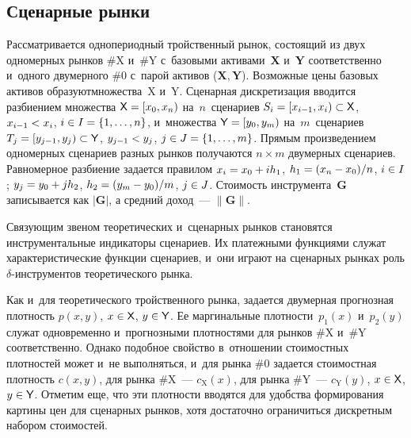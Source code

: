 \begin{multicols}{2}
\vspace*{-9pt} 
  
  \section{Сценарные рынки}
  
  \vspace*{-2pt}
  
  Рассматривается однопериодный тройственный рынок, состоящий из двух 
одномерных рынков \#X и~\#Y с~базовыми активами~$\boldsymbol{X}$ 
и~$\boldsymbol{Y}$ соответственно и~одного двумерного \#0 с~парой активов 
($\boldsymbol{X}, \boldsymbol{Y}$). Возможные цены базовых активов 
образуют\linebreak множества~{\sf X} и~{\sf Y}. Сценарная дискретизация\linebreak
 вводится 
разбиением множества ${\sf X} \hm=  [x_0, x_n)$ на~$n$~сценариев 
$S_i \hm= [x_{i-1}, x_i) \hm\subset {\sf X}$, $x_{i-1}\hm< x_i$, 
$i \hm\in I \hm= \{1, \ldots , n\}$, и~множества ${\sf Y}\hm = [y_0, y_m)$ 
на~$m$~сценариев $T_j\hm = [y_{j-1}, y_j) \hm\subset {\sf  Y}$, $y_{j-1}\hm<  y_j$, 
$j \hm\in J \hm= \{1, \ldots , m\}$. Прямым произведением одномерных 
сценариев разных рынков получаются $n\times m$ двумерных сценариев. 
Равномерное разбиение задается правилом $x_i \hm= x_0 \hm+ ih_1$, 
$h_1 \hm= (x_n \hm- x_0)/n$, $i \hm\in I$; $y_j\hm = y_0 + jh_2$, $h_2 \hm= (y_m \hm-
 y_0)/m$, $j\hm\in J$. Стоимость инструмента~$\boldsymbol{G}$ записывается 
как $\vert \boldsymbol{G}\vert$, а средний доход~--- $\| \boldsymbol{G}\|$.
  
  Связующим звеном теоретических и~сценарных рынков становятся 
инструментальные индикаторы сценариев. Их платежными функциями служат 
характеристические функции сценариев, и~они играют на сценарных рынках 
роль $\delta$-ин\-стру\-мен\-тов теоретического рынка. 
  
  Как и~для теоретического тройственного рынка, задается двумерная 
прогнозная плотность $p(x, y)$, $x\hm\in {\sf X}$, $y\hm\in {\sf Y}$. Ее 
маргинальные плотности~$p_1(x)$ и~$p_2(y)$ служат одновременно 
и~прогнозными плотностями для рынков \#X и~\#Y соответственно. Однако 
подобное свойство в~отношении стоимостных плотностей может и~не 
выполняться, и~для рынка \#0 задается стоимостная плотность $c(x, y)$, для 
рынка \#X~--- $c_{\mathrm{X}}(x)$, для рынка \#Y~--- $c_{\mathrm{Y}}(y)$, 
$x\hm\in {\sf  X}$, $y\hm\in {\sf Y}$. Отметим еще, что эти плотности вводятся 
для удобства формирования картины цен для сценарных рынков, хотя 
достаточно ограничиться дискретным набором стоимостей. 
  

\end{multicols}
